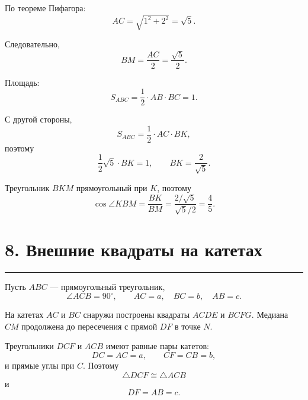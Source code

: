 \documentclass[a4paper,12pt]{article}
\newcommand{\sectionrule}{%
  \par\vspace{-0.35em}%
  {\color{accent!60}\rule{\linewidth}{0.7pt}}%
  \vspace{0.35em}
}
\begin{document}
По теореме Пифагора:
\[
AC=\sqrt{1^2+2^2}=\sqrt5.
\]

Следовательно,
\[
BM=\frac{AC}{2}=\frac{\sqrt5}{2}.
\]

Площадь:
\[
S_{ABC}
=
\frac12\cdot AB\cdot BC
=
1.
\]

С другой стороны,
\[
S_{ABC}
=
\frac12\cdot AC\cdot BK,
\]
поэтому
\[
\frac12\sqrt5\cdot BK=1,
\qquad
BK=\frac{2}{\sqrt5}.
\]

Треугольник \(BKM\) прямоугольный при \(K\), поэтому
\[
\cos\angle KBM
=
\frac{BK}{BM}
=
\frac{2/\sqrt5}{\sqrt5/2}
=
\boxed{\frac45}.
\]

\section*{\textcolor{darkaccent}{8. Внешние квадраты на катетах}}
\sectionrule

Пусть \(ABC\) --- прямоугольный треугольник,
\[
\angle ACB=90^\circ,
\qquad
AC=a,\quad BC=b,\quad AB=c.
\]

На катетах \(AC\) и \(BC\) снаружи построены квадраты
\(ACDE\) и \(BCFG\).
Медиана \(CM\) продолжена до пересечения с прямой \(DF\) в точке \(N\).

\begin{center}
\end{center}

Треугольники \(DCF\) и \(ACB\) имеют равные пары катетов:
\[
DC=AC=a,
\qquad
CF=CB=b,
\]
и прямые углы при \(C\). Поэтому
\[
\triangle DCF\cong\triangle ACB
\]
и
\[
DF=AB=c.
\]
\end{document}
